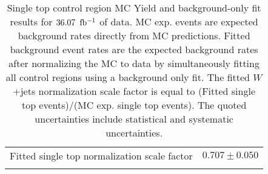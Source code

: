 \begin{table}[h!]
\begin{center}
{\begin{tabular*}{\textwidth}{@{\extracolsep{\fill}}lr}
\noalign{\smallskip}\hline\noalign{\smallskip}
Fitted single top normalization scale factor & $0.707 \pm 0.050$ \\
\noalign{\smallskip}\hline\noalign{\smallskip}
\end{tabular*}
}
\end{center}
\caption[Single top control region MC Yield and background-only fit results for $\intlumi$ $\ifb$ of data]{Single top control region MC Yield and background-only fit results for $\intlumi$ $\ifb$ of data. MC exp. events are expected background rates directly from MC predictions.  Fitted background event rates are the expected background rates after normalizing the MC to data by simultaneously fitting all control regions using a background only fit.  The fitted $W$+jets normalization scale factor is equal to (Fitted single top events)/(MC exp. single top events). The quoted uncertainties include statistical and systematic uncertainties. }
\label{table.bkgonly.CRST}
\end{table}
%